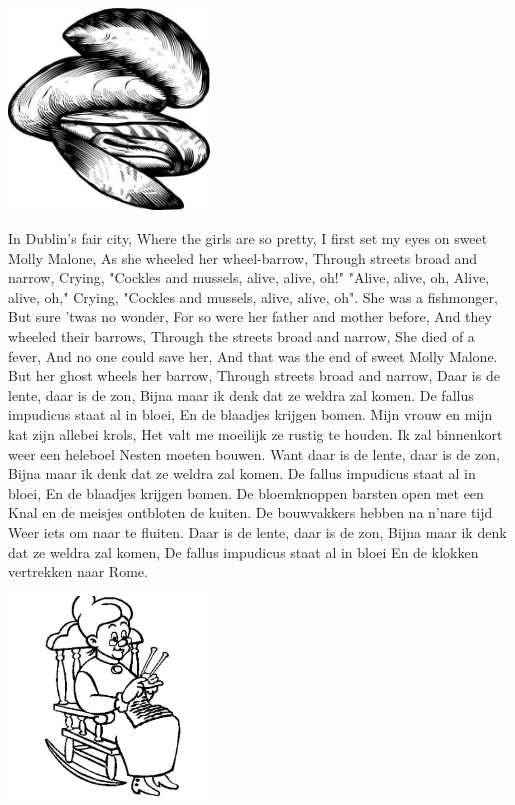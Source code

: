 \documentclass{article}
\begin{document}
\begin{songs}{}
\begin{intersong}
    \includegraphics[width=0.4\textwidth]{cocklesandmussels}
\end{intersong}
\beginverse
In Dublin's fair city, Where the girls are so pretty,
I first set my eyes on sweet Molly Malone,
As she wheeled her wheel-barrow,
Through streets broad and narrow,
\endverse
\beginchorus
Crying, "Cockles and mussels, alive, alive, oh!"
"Alive, alive, oh, Alive, alive, oh,"
Crying,  "Cockles and mussels, alive, alive, oh".
\endchorus
\beginverse
She was a fishmonger, But sure 'twas no wonder,
For so were her father and mother before,
And they wheeled their barrows,
Through the streets broad and narrow,
\endverse
\beginverse
She died of a fever, And no one could save her,
And that was the end of sweet Molly Malone.
But her ghost wheels her barrow,
Through streets broad and narrow,
\endverse
\endsong
{}
\beginverse*
Daar is de lente, daar is de zon,
Bijna maar ik denk dat ze weldra zal komen.
De fallus impudicus staat al in bloei,
En de blaadjes krijgen bomen. 
\endverse
\beginverse*
Mijn vrouw en mijn kat zijn allebei krols,
Het valt me moeilijk ze rustig te houden.
Ik zal binnenkort weer een heleboel
Nesten moeten bouwen. 
\endverse
\beginverse*
Want daar is de lente, daar is de zon,
Bijna maar ik denk dat ze weldra zal komen.
De fallus impudicus staat al in bloei,
En de blaadjes krijgen bomen.
\endverse
\beginverse*
De bloemknoppen barsten open met een 
Knal en de meisjes ontbloten de kuiten.
De bouwvakkers hebben na n’nare tijd
Weer iets om naar te fluiten. 
\endverse
\beginverse*
Daar is de lente, daar is de zon,
Bijna maar ik denk dat ze weldra zal komen,
De fallus impudicus staat al in bloei
En de klokken vertrekken naar Rome. 
\endverse
\endsong
\begin{intersong}
    \includegraphics[width=0.4\textwidth]{daarwaseenwufdiespon}

\end{intersong}
\end{songs}
\end{document}
